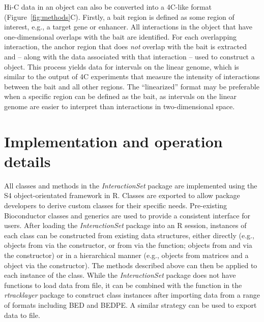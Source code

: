 \documentclass[10pt,a4paper,twocolumn]{article}
\begin{document}
Hi-C data in an  object can also be converted into a 4C-like format (Figure~\ref{fig:methods}C).
Firstly, a bait region is defined as some region of interest, e.g., a target gene or enhancer.
All interactions in the  object that have one-dimensional overlaps with the bait are identified.
For each overlapping interaction, the anchor region that does \textit{not} overlap with the bait is extracted and -- along with the data associated with that interaction -- used to construct a  object.
This process yields data for intervals on the linear genome, which is similar to the output of 4C experiments \cite{simonis2006nuclear} that measure the intensity of interactions between the bait and all other regions.
The ``linearized'' format may be preferable when a specific region can be defined as the bait, as intervals on the linear genome are easier to interpret than interactions in two-dimensional space.

\section*{Implementation and operation details}
All classes and methods in the \textit{InteractionSet} package are implemented using the S4 object-orientated framework in R.
Classes are exported to allow package developers to derive custom classes for their specific needs.
Pre-existing Bioconductor classes and generics are used to provide a consistent interface for users.
After loading the \textit{InteractionSet} package into an R session, instances of each class can be constructed from existing data structures, either directly (e.g.,  objects from  via the  constructor, or from  via the  function;  objects from  and  via the  constructor) or in a hierarchical manner (e.g.,  objects from matrices and a  object via the  constructor).
The methods described above can then be applied to each instance of the class.
While the \textit{InteractionSet} package does not have functions to load data from file, it can be combined with the  function in the \textit{rtracklayer} package \cite{lawrence2009rtracklayer} to construct class instances after importing data from a range of formats including BED and BEDPE.
A similar strategy can be used to export data to file.
\end{document}

